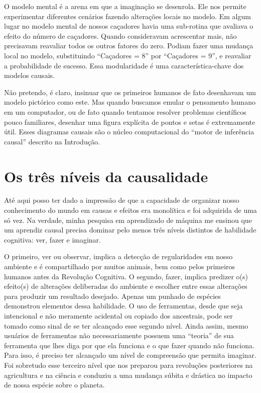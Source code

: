 \documentclass[11pt,a5paper,twoside]{book}
\begin{document}
O modelo mental é a arena em que a imaginação se desenrola. Ele nos permite experimentar diferentes cenários fazendo alterações locais no modelo. Em algum lugar no modelo mental de nossos caçadores havia uma sub-rotina que avaliava o efeito do número de caçadores. Quando consideravam acrescentar mais, não precisavam reavaliar todos os outros fatores do zero. Podiam fazer uma mudança local no modelo, substituindo “Caçadores = 8” por “Caçadores = 9”, e reavaliar a probabilidade de sucesso. Essa modularidade é uma característica-chave dos modelos causais.

Não pretendo, é claro, insinuar que os primeiros humanos de fato desenhavam um modelo pictórico como este. Mas quando buscamos emular o pensamento humano em um computador, ou de fato quando tentamos resolver problemas científicos pouco familiares, desenhar uma figura explícita de pontos e setas é extremamente útil. Esses diagramas causais são o núcleo computacional do “motor de inferência causal” descrito na Introdução.

\section{Os três níveis da causalidade}
Até aqui posso ter dado a impressão de que a capacidade de organizar nosso conhecimento do mundo em causas e efeitos era monolítica e foi adquirida de uma só vez. Na verdade, minha pesquisa em aprendizado de máquina me ensinou que um aprendiz causal precisa dominar pelo menos três níveis distintos de habilidade cognitiva: ver, fazer e imaginar.

O primeiro, ver ou observar, implica a detecção de regularidades em nosso ambiente e é compartilhado por muitos animais, bem como pelos primeiros humanos antes da Revolução Cognitiva. O segundo, fazer, implica predizer o(s) efeito(s) de alterações deliberadas do ambiente e escolher entre essas alterações para produzir um resultado desejado. Apenas um punhado de espécies demonstrou elementos dessa habilidade. O uso de ferramentas, desde que seja intencional e não meramente acidental ou copiado dos ancestrais, pode ser tomado como sinal de se ter alcançado esse segundo nível. Ainda assim, mesmo usuários de ferramentas não necessariamente possuem uma “teoria” de sua ferramenta que lhes diga por que ela funciona e o que fazer quando não funciona. Para isso, é preciso ter alcançado um nível de compreensão que permita imaginar. Foi sobretudo esse terceiro nível que nos preparou para revoluções posteriores na agricultura e na ciência e conduziu a uma mudança súbita e drástica no impacto de nossa espécie sobre o planeta.
\end{document}

